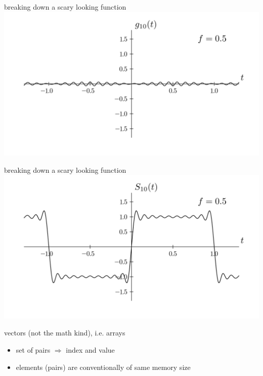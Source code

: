 \documentclass{beamer}
\begin{document}
	\begin{frame}{breaking down a scary looking function}
		\includegraphics[width=\linewidth,height=0.85\textheight,keepaspectratio]{../assets/tenth-term-function.png}
	\end{frame}
	
	\begin{frame}{breaking down a scary looking function}
		\includegraphics[width=\linewidth,height=0.85\textheight,keepaspectratio]{../assets/sum-ten-terms.png}
	\end{frame}
	
	\begin{frame}{vectors (not the math kind), i.e. arrays}
		\begin{itemize}
			\item[] set of pairs $\Rightarrow$ index and value
			\item[] elements (pairs) are conventionally of same memory size
		\end{itemize}
	\end{frame}
	
\end{document}
